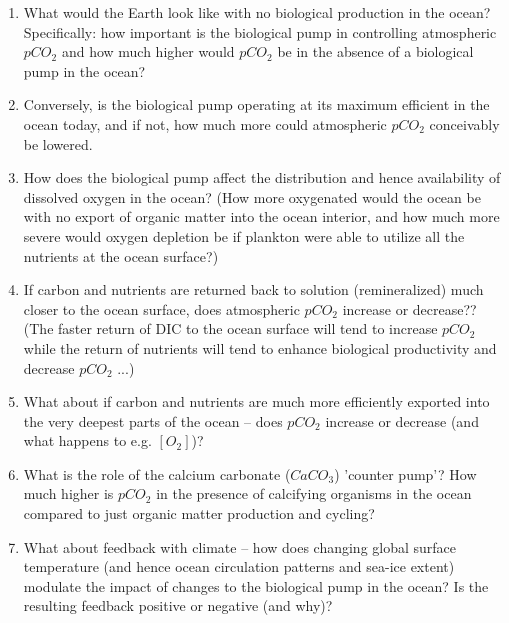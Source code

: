 \documentclass[11pt,fleqn]{book} %
\begin{document}
\begin{enumerate}[noitemsep]
\vspace{1mm}
\item What would the Earth look like with no biological production in the ocean? Specifically: how important is the biological pump in controlling atmospheric \(pCO_{2}\) and how much higher would \(pCO_{2}\) be in the absence of a biological pump in the ocean?
\vspace{1mm}
\item Conversely, is the biological pump operating at its maximum efficient in the ocean today, and if not, how much more could atmospheric \(pCO_{2}\) conceivably be lowered.
\vspace{1mm}
\item How does the biological pump affect the distribution and hence availability of dissolved oxygen in the ocean? (How more oxygenated would the ocean be with no export of organic matter into the ocean interior, and how much more severe would oxygen depletion be if plankton were able to utilize all the nutrients at the ocean surface?)
\vspace{1mm}
\item If carbon and nutrients are returned back to solution (remineralized) much closer to the ocean surface, does atmospheric \(pCO_{2}\) increase or decrease?? (The faster return of DIC to the ocean surface will tend to increase \(pCO_{2}\) while the return of nutrients will tend to enhance biological productivity and decrease \(pCO_{2}\) ...)
\vspace{1mm}
\item What about if carbon and nutrients are much more efficiently exported into the very deepest parts of the ocean -- does \(pCO_{2}\) increase or decrease (and what happens to e.g. \([O_{2}]\))?
\vspace{1mm}
\item What is the role of the calcium carbonate (\(CaCO_{3}\)) 'counter pump'? How much higher is \(pCO_{2}\) in the presence of calcifying organisms in the ocean compared to just organic matter production and cycling?
\vspace{1mm}
\item What about feedback with climate -- how does changing global surface temperature (and hence ocean circulation patterns and sea-ice extent) modulate the impact of changes to the biological pump in the ocean? Is the resulting feedback positive or negative (and why)?
\end{enumerate}
\vspace{1mm}
\end{document}
